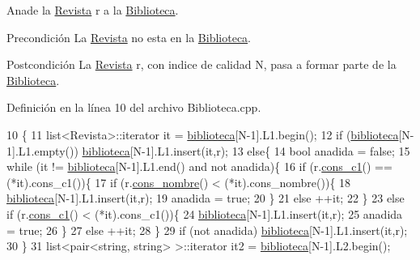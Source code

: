 Anade la \hyperlink{class_revista}{Revista} r a la \hyperlink{class_biblioteca}{Biblioteca}. 

\begin{DoxyPrecond}{Precondición}
La \hyperlink{class_revista}{Revista} no esta en la \hyperlink{class_biblioteca}{Biblioteca}. 
\end{DoxyPrecond}
\begin{DoxyPostcond}{Postcondición}
La \hyperlink{class_revista}{Revista} r, con indice de calidad N, pasa a formar parte de la \hyperlink{class_biblioteca}{Biblioteca}. 
\end{DoxyPostcond}


Definición en la línea 10 del archivo Biblioteca.\-cpp.


\begin{DoxyCode}
10                                                \{
11     list<Revista>::iterator it = \hyperlink{class_biblioteca_a83688a3fd707fd8671178e82d7c53f6e}{biblioteca}[N-1].L1.begin();
12     \textcolor{keywordflow}{if} (\hyperlink{class_biblioteca_a83688a3fd707fd8671178e82d7c53f6e}{biblioteca}[N-1].L1.empty()) \hyperlink{class_biblioteca_a83688a3fd707fd8671178e82d7c53f6e}{biblioteca}[N-1].L1.insert(it,r);
13     \textcolor{keywordflow}{else}\{
14   \textcolor{keywordtype}{bool} anadida = \textcolor{keyword}{false};
15   \textcolor{keywordflow}{while} (it != \hyperlink{class_biblioteca_a83688a3fd707fd8671178e82d7c53f6e}{biblioteca}[N-1].L1.end() and not anadida)\{
16       \textcolor{keywordflow}{if} (r.\hyperlink{class_revista_ae069d5a6c3e1c7996388505b4fde5a53}{cons\_c1}() == (*it).cons\_c1())\{
17     \textcolor{keywordflow}{if} (r.\hyperlink{class_revista_a2739f78a2d67490287421da71b5ea2f6}{cons\_nombre}() < (*it).cons\_nombre())\{
18         \hyperlink{class_biblioteca_a83688a3fd707fd8671178e82d7c53f6e}{biblioteca}[N-1].L1.insert(it,r);
19         anadida = \textcolor{keyword}{true};
20     \}
21     \textcolor{keywordflow}{else} ++it;
22       \}
23       \textcolor{keywordflow}{else} \textcolor{keywordflow}{if} (r.\hyperlink{class_revista_ae069d5a6c3e1c7996388505b4fde5a53}{cons\_c1}() < (*it).cons\_c1())\{
24     \hyperlink{class_biblioteca_a83688a3fd707fd8671178e82d7c53f6e}{biblioteca}[N-1].L1.insert(it,r);
25     anadida = \textcolor{keyword}{true};
26       \}
27       \textcolor{keywordflow}{else} ++it;
28   \}
29   \textcolor{keywordflow}{if} (not anadida) \hyperlink{class_biblioteca_a83688a3fd707fd8671178e82d7c53f6e}{biblioteca}[N-1].L1.insert(it,r);
30     \}
31     list<pair<string, string> >::iterator it2 = \hyperlink{class_biblioteca_a83688a3fd707fd8671178e82d7c53f6e}{biblioteca}[N-1].L2.begin();

\end{DoxyCode}
